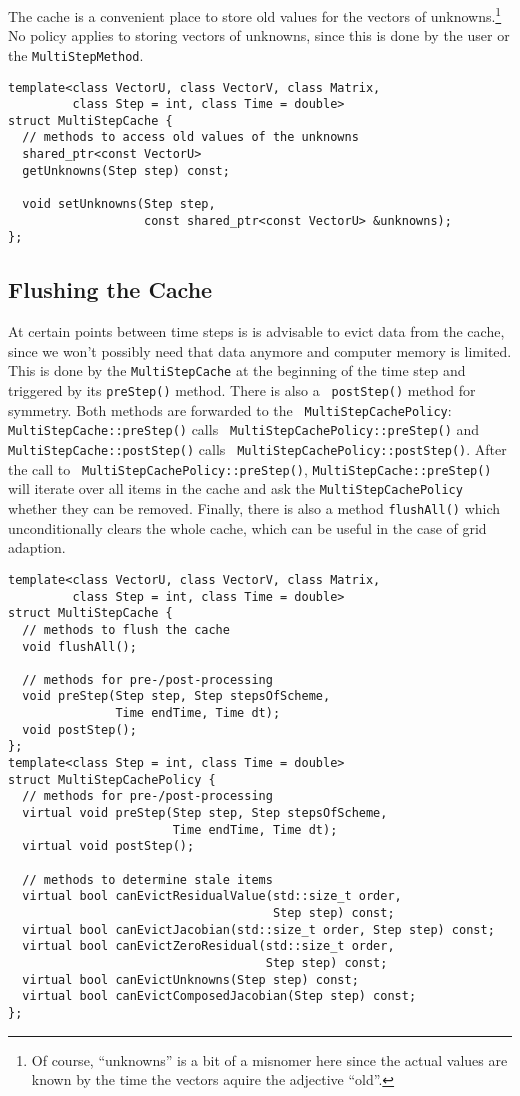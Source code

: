 \documentclass[11pt,a4paper,DIV11,%
notitlepage,oneside,abstracton,%
bibtotoc]{scrartcl}
\begin{document}
The cache is a convenient place to store old values for the vectors of
unknowns.\footnote{Of course, ``unknowns'' is a bit of a misnomer here since
  the actual values are known by the time the vectors aquire the adjective
  ``old''.}  No policy applies to storing vectors of unknowns, since this is
done by the user or the {\tt MultiStepMethod}.
\begin{lstlisting}
template<class VectorU, class VectorV, class Matrix,
         class Step = int, class Time = double>
struct MultiStepCache {
  // methods to access old values of the unknowns
  shared_ptr<const VectorU>
  getUnknowns(Step step) const;

  void setUnknowns(Step step,
                   const shared_ptr<const VectorU> &unknowns);
};
\end{lstlisting}

\subsection{Flushing the Cache}

At certain points between time steps is is advisable to evict data from the
cache, since we won't possibly need that data anymore and computer memory is
limited.  This is done by the {\tt MultiStepCache} at the beginning of the
time step and triggered by its {\tt preStep()} method.  There is also a {\tt
  postStep()} method for symmetry.  Both methods are forwarded to the {\tt
  Multi\-Step\-Cache\-Policy}: {\tt MultiStepCache::preStep()} calls {\tt
  Multi\-Step\-Cache\-Policy\discretionary{}{}{}::\discretionary{}{}{}pre\-Step()}
and {\tt MultiStepCache::postStep()} calls {\tt
  MultiStepCachePolicy::postStep()}.  After the call to {\tt
  MultiStepCachePolicy::preStep()}, {\tt MultiStepCache::preStep()} will
iterate over all items in the cache and ask the {\tt MultiStepCachePolicy}
whether they can be removed.  Finally, there is also a method {\tt flushAll()}
which unconditionally clears the whole cache, which can be useful in the case
of grid adaption.
\begin{lstlisting}
template<class VectorU, class VectorV, class Matrix,
         class Step = int, class Time = double>
struct MultiStepCache {
  // methods to flush the cache
  void flushAll();

  // methods for pre-/post-processing
  void preStep(Step step, Step stepsOfScheme,
               Time endTime, Time dt);
  void postStep();
};
template<class Step = int, class Time = double>
struct MultiStepCachePolicy {
  // methods for pre-/post-processing
  virtual void preStep(Step step, Step stepsOfScheme,
                       Time endTime, Time dt);
  virtual void postStep();

  // methods to determine stale items
  virtual bool canEvictResidualValue(std::size_t order,
                                     Step step) const;
  virtual bool canEvictJacobian(std::size_t order, Step step) const;
  virtual bool canEvictZeroResidual(std::size_t order,
                                    Step step) const;
  virtual bool canEvictUnknowns(Step step) const;
  virtual bool canEvictComposedJacobian(Step step) const;
};
\end{lstlisting}
\end{document}
